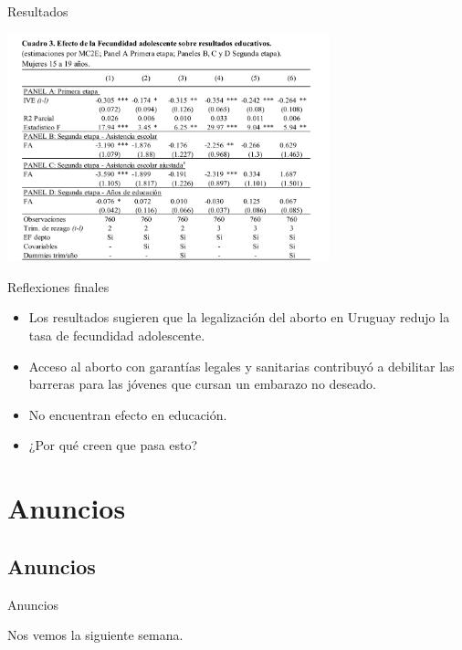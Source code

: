 \documentclass[11pt, aspectratio=169, compress]{beamer}
\makeatletter
\def\beamer@writeslidentry@miniframesoff{%
	\expandafter\beamer@ifempty\expandafter{\beamer@framestartpage}{}%
	{%
		\clearpage\beamer@notesactions%
	}
}
\newcommand*{\miniframesoff}{\let\beamer@writeslidentry=\beamer@writeslidentry@miniframesoff}
\makeatother
\begin{document}
\begin{frame}[t]{Resultados}
\vspace*{-2ex}
\begin{center}
	\includegraphics[width=0.7\textwidth]{tab3}
\end{center}
\end{frame}
\begin{frame}[t]{Reflexiones finales}
\begin{itemize}
	\item Los resultados sugieren que la legalización del aborto en Uruguay redujo la tasa de
	fecundidad adolescente. 
	\item Acceso al aborto con garantías legales y sanitarias contribuyó a debilitar las
	barreras para las jóvenes que cursan un embarazo no deseado. 
	\item No encuentran efecto en educación. 
	\item ¿Por qué creen que pasa esto? 
\end{itemize}
\end{frame}
\section{Anuncios}
\subsection{Anuncios}
\begin{frame}{Anuncios}
	
\end{frame}
\miniframesoff 	
\begin{frame}
Nos vemos la siguiente semana. 
\end{frame}
\end{document}
